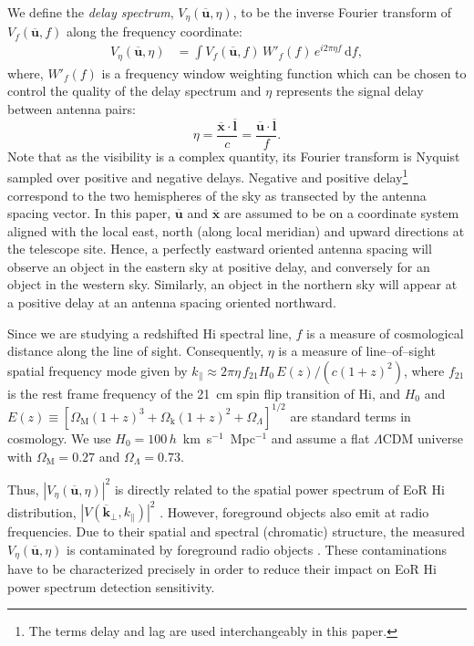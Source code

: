 \documentclass[preprint2,iop,numberedappendix]{emulateapj}
\newcommand{\dif}{\mathrm{d}}
\begin{document}
We define the {\it delay spectrum}, $V_\eta(\overline{\mathbf{u}},\eta)$, to be the inverse Fourier transform of $V_f(\overline{\mathbf{u}},f)$ along the frequency coordinate:
\begin{align}\label{eqn:delay-transform}
  V_\eta(\overline{\mathbf{u}},\eta) &= \int V_f(\overline{\mathbf{u}},f)\,W'_f(f)\,e^{i2\pi\eta f}\,\dif f,
\end{align}
where, $W'_f(f)$ is a frequency window weighting function which can be chosen to control the quality of the delay spectrum \citep{thy13,ved12} and $\eta$ represents the signal delay between antenna pairs:
\begin{equation}\label{eqn:delay}
  \eta = \frac{\overline{\mathbf{x}}\cdot\overline{\mathbf{l}}}{c} = \frac{\overline{\mathbf{u}}\cdot\overline{\mathbf{l}}}{f}.
\end{equation}
Note that as the visibility is a complex quantity, its Fourier transform is Nyquist sampled over positive and negative delays. Negative and positive delay\footnote{The terms delay and lag are used interchangeably in this paper.} correspond to the two hemispheres of the sky as transected by the antenna spacing vector. In this paper, $\overline{\mathbf{u}}$ and $\overline{\mathbf{x}}$ are assumed to be on a coordinate system aligned with the local east, north (along local meridian) and upward directions at the telescope site. Hence, a perfectly eastward oriented antenna spacing will observe an object in the eastern sky at positive delay, and conversely for an object in the western sky. Similarly, an object in the northern sky will appear at a positive delay at an antenna spacing oriented northward.

Since we are studying a redshifted H{\sc i} spectral line, $f$ is a measure of cosmological distance along the line of sight. Consequently, $\eta$ is a measure of line--of--sight spatial frequency mode given by $k_\parallel\approx 2\pi\eta\,f_{21}H_0\,E(z)/(c(1+z)^2)$, where $f_{21}$ is the rest frame frequency of the 21~cm spin flip transition of H{\sc i}, and $H_0$ and $E(z)\equiv [\Omega_\textrm{M}(1+z)^3+\Omega_\textrm{k}(1+z)^2+\Omega_\Lambda]^{1/2}$ are standard terms in cosmology. We use $H_0=100\,h$~km~s$^{-1}$~Mpc$^{-1}$ and assume a flat $\Lambda$CDM universe with $\Omega_\textrm{M}=0.27$ and $\Omega_\Lambda=0.73$.

Thus, $|V_\eta(\overline{\mathbf{u}},\eta)|^2$ is directly related to the spatial power spectrum of EoR H{\sc i} distribution, $|V(\overline{\mathbf{k}}_\perp,k_\parallel)|^2$ \citep{mor04}. However, foreground objects also emit at radio frequencies. Due to their spatial and spectral (chromatic) structure, the measured $V_\eta(\overline{\mathbf{u}},\eta)$ is contaminated by foreground radio objects \citep{thy13,tro12,mor12,bow09}. These contaminations have to be characterized precisely in order to reduce their impact on EoR H{\sc i} power spectrum detection sensitivity. 
\end{document}
